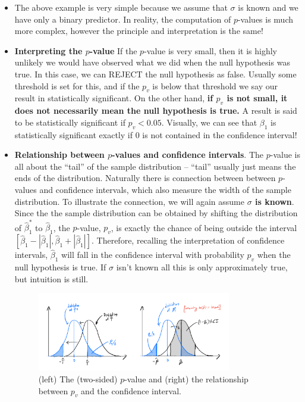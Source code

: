 \begin{itemize}
\begin{example}
\end{example}

\item The above example is very simple because we assume that $\sigma$ is known and we have only a binary predictor. In reality, the computation of $p$-values is much more complex, however the principle and interpretation is the same!
\item {\bf Interpreting the $p$-value} If the $p$-value is very small, then it is highly unlikely we would have observed what we did when the null hypothesis was true. In this case, we can REJECT the null hypothesis as false. Usually some threshold is set for this, and if the $p_v$ is below that threshold we say our result in statistically significant. On the other hand, {\bf if $p_v$ is not small, it does not necessarily mean the null hypothesis is true.} A result is said to be statistically significant if $p_v<0.05$. Visually, we can see that $\beta_1$ is statistically significant exactly if $0$ is not contained in the confidence interval! 
\item {\bf Relationship between $p$-values and confidence intervals}.  The $p$-value is all about the ``tail'' of the sample distribution -- ``tail'' usually just means the ends of the distribution. Naturally there is connection between between $p$-values and confidence intervals, which also measure the width of the sample distribution. To illustrate the connection, we will again assume {\bf $\sigma$ is known}.  Since the  the sample distribution can be obtained by shifting the distribution of $\hat{\beta}_1^*$ to $\hat{\beta}_1$, the $p$-value, $p_v$, is exactly the chance of being outside the interval $[\hat{\beta}_1 - |\hat{\beta}_1|,\hat{\beta}_1 + |\hat{\beta}_1|]$. Therefore,  recalling the interpretation of confidence intervals, $\hat{\beta}_1$ will fall in the confidence interval with probability $p_v$ when the null hypothesis is true.  If $\sigma$ isn't known all this is only approximately true, but intuition is still. 



\begin{figure}[h]
\centering
\includegraphics[width=0.8\textwidth]{./../figures/pvalueCI}
\caption{(left) The (two-sided) $p$-value and (right) the relationship between $p_v$ and the confidence interval. }\label{fig:pvalue}
\end{figure}


\end{itemize}





